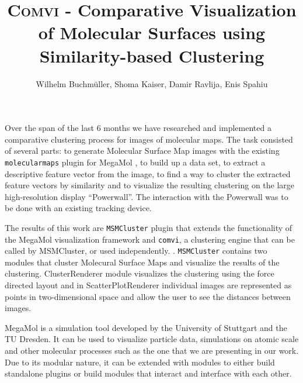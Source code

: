 \documentclass[journal]{vgtc}       %
\title{\textsc{Comvi} - Comparative Visualization of Molecular Surfaces using Similarity-based Clustering}
\author{Wilhelm Buchm\"uller, Shoma Kaiser, Damir Ravlija, Enis Spahiu}
\newcommand{\todo}[1]{\textcolor{red}{\textbf{TODO:} #1}}
\begin{document}

\label{sec:intro}
%
\maketitle
%
Over the span of the last 6 months we  have researched and implemented a comparative clustering  process for images of molecular maps.
The task consisted of several parts: to generate Molecular Surface Map images with the existing \verb|molecularmaps| plugin for MegaMol \cite{MegaMol}, to build up a data set, to extract a descriptive feature vector from the image, to find a way to cluster the extracted  feature vectors by similarity  and to visualize the resulting clustering on the large high-resolution display ``Powerwall''. The interaction with the Powerwall was to be done with  an existing tracking device.

The results of this work are \verb|MSMCluster| plugin that  extends the functionality of the MegaMol\cite{MegaMol} visualization framework and \verb|comvi|, a clustering engine that can be called by MSMCluster, or used independently. . \verb|MSMCluster| contains two modules that cluster Molecural Surface Maps and visualize the results of the clustering. ClusterRenderer module visualizes the clustering using the force directed layout and in ScatterPlotRenderer individual images are represented as points in two-dimensional space and allow the user to see the distances between images. 

MegaMol is a simulation tool developed by the University of Stuttgart and the TU Dresden. It can be used to visualize particle data, simulations on atomic scale and other molecular processes such as the one that we are presenting in our work. 
Due to its modular nature, it can be extended with modules to either build standalone plugins or build modules that interact and interface with each other.
\end{document}
